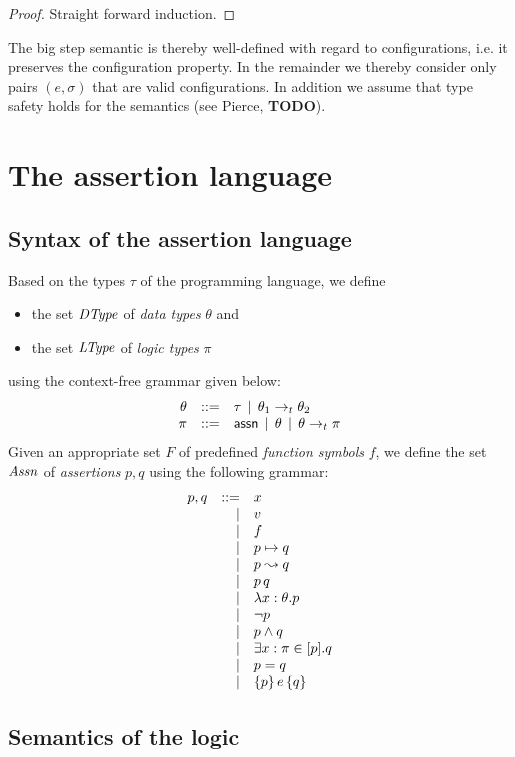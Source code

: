 \documentclass[12pt,a4paper]{report}
\begin{document}
\begin{proof}
  Straight forward induction.
\end{proof}

The big step semantic is thereby well-defined with regard to configurations, i.e. it preserves
the configuration property. In the remainder
we thereby consider only pairs $(e,\sigma)$ that are valid configurations. In addition we
assume that type safety holds for the semantics (see Pierce, {\bf TODO}).



\chapter{The assertion language}



\section{Syntax of the assertion language}

Based on the types $\tau$ of the programming language, we define
\begin{itemize}
  \item the set $\mathit{DType}$ of {\em data types} $\theta$ and
  \item the set $\mathit{LType}$ of {\em logic types} $\pi$
\end{itemize}
using the context-free grammar given below:
\[\begin{array}{rrlll}
  \theta & ::= & \tau \,\mid\, \theta_1\rightarrow_t\theta_2 \\
  \pi & ::= & \mathsf{assn} \,\mid\, \theta \,\mid\, \theta\rightarrow_t\pi
\end{array}\]
Given an appropriate set $F$ of predefined {\em function symbols} $f$, we
define the set $\mathit{Assn}$ of {\em assertions} $p,q$ using the following grammar:
\[\begin{array}{rrlll}
  p,q & ::= & x
      \\ & \mid & v
      \\ & \mid & f
      \\ & \mid & p \mapsto q
      \\ & \mid & p \leadsto q
      \\ & \mid & p\,q
      \\ & \mid & \lambda x:\theta.p
      \\ & \mid & \neg p
      \\ & \mid & p \wedge q
      \\ & \mid & \exists x:\pi \in [p]. q
      \\ & \mid & p = q
      \\ & \mid & \{p\}\,e\,\{q\}
\end{array}\]



\section{Semantics of the logic}


\end{document}
